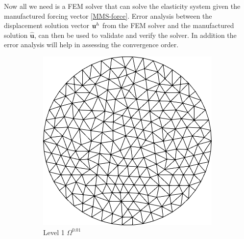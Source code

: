 \documentclass{report}
\newcommand{\bu}{\textbf{u}}
\newcommand{\wbu}{\widehat{\textbf{u}}}
\def\bu{{\bf{u}}}
\begin{document}
\begin{itemize}
Now all we need is a FEM solver that can solve the elasticity system given the manufactured forcing vector \eqref{MMS-force}. Error analysis between the displacement solution vector $\bu^h$ from the FEM solver and the manufactured solution $\wbu$, can then be used to validate and verify the solver. In addition the error analysis will help in assessing the convergence order.  

\end{itemize}

 \begin{figure}[t]
 \centering
 \begin{subfigure}[t]{.23\linewidth}
 \includegraphics[width=1\textwidth]{./Images/M0.png}
 \caption{Level 1 $\Omega^{0.01}$}
 \end{subfigure}\hfill
  \begin{subfigure}[t]{.23\linewidth}

\end{subfigure}
\end{figure}
\end{document}

